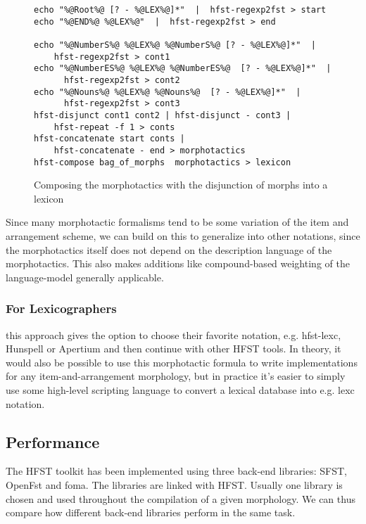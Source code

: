 \documentclass[draft]{llncs}
\begin{document}
\begin{figure} [h!]
{\footnotesize
\begin{verbatim}
echo "%@Root%@ [? - %@LEX%@]*"  |  hfst-regexp2fst > start
echo "%@END%@ %@LEX%@"  |  hfst-regexp2fst > end

echo "%@NumberS%@ %@LEX%@ %@NumberS%@ [? - %@LEX%@]*"  |
    hfst-regexp2fst > cont1
echo "%@NumberES%@ %@LEX%@ %@NumberES%@  [? - %@LEX%@]*"  |
      hfst-regexp2fst > cont2
echo "%@Nouns%@ %@LEX%@ %@Nouns%@  [? - %@LEX%@]*"  |
      hfst-regexp2fst > cont3
hfst-disjunct cont1 cont2 | hfst-disjunct - cont3 |
    hfst-repeat -f 1 > conts
hfst-concatenate start conts |
    hfst-concatenate - end > morphotactics
hfst-compose bag_of_morphs  morphotactics > lexicon
\end{verbatim}
}
\caption{Composing the morphotactics with the disjunction of morphs into a lexicon}
\label{fig:morphology2}
\end{figure}

Since many morphotactic formalisms tend to be some variation of the item and arrangement scheme,
we can build on this to generalize into other notations, since the morphotactics itself
does not depend on the description language of the morphotactics. 
This also makes additions like compound-based weighting of the language-model 
\cite{linden/2009/fsmnlp} generally applicable.

\subsubsection{For Lexicographers} this approach gives the option to
choose their favorite notation, e.g. hfst-lexc, Hunspell or Apertium and then continue with other
HFST tools. In theory, it would also be possible to use this morphotactic formula
to write implementations for any item-and-arrangement morphology, but in practice
it's easier to simply use some high-level scripting language to convert a lexical database into 
e.g. lexc notation.

\subsection{Performance}

The HFST toolkit has been implemented using three back-end libraries:
SFST, OpenFst and foma. The libraries are linked with HFST. Usually one library is chosen
and used throughout the compilation of a given morphology.
We can thus compare how different back-end libraries perform
in the same task.
\end{document}
